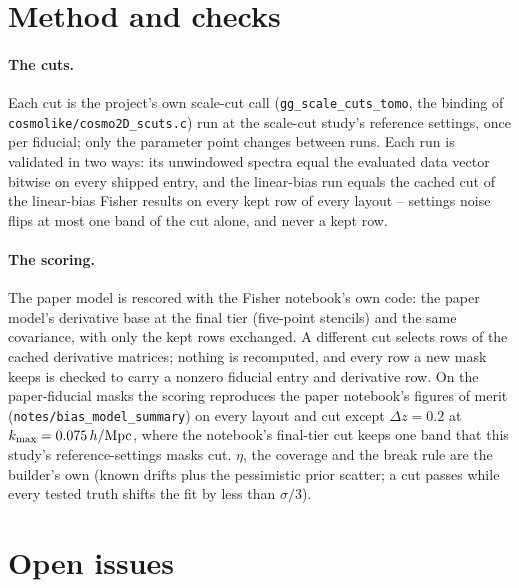 \documentclass[11pt]{article}
\newcommand{\kmax}{k_{\rm max}}
\newcommand{\hMpc}{\,h/{\rm Mpc}}
\newcommand{\us}{\_\allowbreak}
\begin{document}
\appendix

\section{Method and checks}
\label{app:method}

\paragraph{The cuts.}
Each cut is the project's own scale-cut call
(\texttt{gg\us scale\us cuts\us tomo}, the binding of
\texttt{cosmolike/cosmo2D\us scuts.c}) run at the scale-cut study's
reference settings, once per fiducial; only the parameter point
changes between runs.  Each run is validated in two ways: its
unwindowed spectra equal the evaluated data vector bitwise on every
shipped entry, and the linear-bias run equals the cached cut of the
linear-bias Fisher results on every kept row of every layout --
settings noise flips at most one band of the cut alone, and never a
kept row.

\paragraph{The scoring.}
The paper model is rescored with the Fisher notebook's own code: the
paper model's derivative base at the final tier (five-point
stencils) and the same covariance, with only the kept rows exchanged.
A different cut selects rows of the cached derivative matrices;
nothing is recomputed, and every row a new mask keeps is checked to
carry a nonzero fiducial entry and derivative row.  On the
paper-fiducial masks the scoring reproduces the paper notebook's
figures of merit (\texttt{notes/bias\us model\us summary}) on every
layout and cut except $\Delta z = 0.2$ at $\kmax = 0.075\hMpc$, where
the notebook's final-tier cut keeps one band that this study's
reference-settings masks cut.
$\eta$, the coverage and the break rule are the builder's own
(known drifts plus the pessimistic prior scatter; a cut passes
while every tested truth shifts the fit by less than $\sigma/3$).

\section{Open issues}
\label{app:open}
\end{document}
